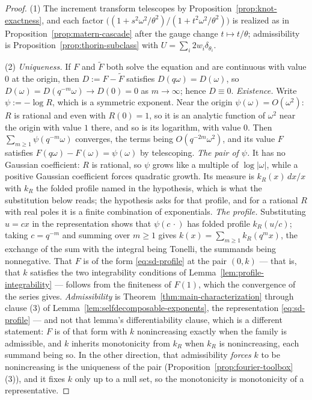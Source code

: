 \begin{proof}
(1) The increment transform telescopes by Proposition~\ref{prop:knot-exactness}, and each
factor $\bigl((1+s^2\omega^2/\theta^2)/(1+t^2\omega^2/\theta^2)\bigr)$ is realized as in
Proposition~\ref{prop:matern-cascade} after the gauge change $t \mapsto t/\theta$;
admissibility is Proposition~\ref{prop:thorin-subclass} with $U = \sum_i 2w_i\delta_{\theta_i}$.

(2) \emph{Uniqueness.} If $F$ and $\tilde F$ both solve the equation and are continuous with
value $0$ at the origin, then $D := F - \tilde F$ satisfies $D(q\omega) = D(\omega)$, so
$D(\omega) = D(q^{-m}\omega) \to D(0) = 0$ as $m \to \infty$; hence $D \equiv 0$.
\emph{Existence.} Write $\psi := -\log R$, which is a symmetric \Levy{} exponent. Near the origin
$\psi(\omega) = O(\omega^2)$: $R$ is rational and even with $R(0) = 1$, so it is an analytic
function of $\omega^2$ near the origin with value $1$ there, and so is its logarithm, with
value $0$. Then
$\sum_{m \ge 1}\psi(q^{-m}\omega)$ converges, the terms being $O(q^{-2m}\omega^2)$, and its
value $F$ satisfies $F(q\omega) - F(\omega) = \psi(\omega)$ by telescoping. \emph{The pair of
$\psi$.} It has no Gaussian coefficient: $R$ is rational, so $\psi$ grows like a multiple of
$\log|\omega|$, while a positive Gaussian coefficient forces quadratic growth. Its \Levy{} measure
is $k_R(x)\,dx/x$ with $k_R$ the folded profile named in the hypothesis, which is what the
substitution below reads; the hypothesis asks for that profile, and for a rational $R$ with real
poles it is a finite combination of exponentials. \emph{The profile.}
Substituting $u = cx$ in the representation shows that $\psi(c\,\cdot)$ has folded profile
$k_R(u/c)$; taking $c = q^{-m}$ and summing over $m \ge 1$ gives
$k(x) = \sum_{m\ge1}k_R(q^mx)$, the exchange of the sum with the integral being Tonelli, the
summands being nonnegative. That $F$ is of the form \ref{eq:sd-profile} at the pair $(0,k)$ ---
that is, that $k$ satisfies the two integrability conditions of
Lemma~\ref{lem:profile-integrability} --- follows from the finiteness of $F(1)$, which the
convergence of the series gives. \emph{Admissibility} is
Theorem~\ref{thm:main-characterization} through clause (3) of
Lemma~\ref{lem:selfdecomposable-exponents}, the representation \ref{eq:sd-profile} --- and not
that lemma's differentiability clause, which is a different statement: $F$ is of that form with $k$ nonincreasing exactly
when the family is admissible, and $k$ inherits monotonicity from $k_R$ when $k_R$ is
nonincreasing, each summand being so. In the other direction, that admissibility \emph{forces}
$k$ to be nonincreasing is the uniqueness of the \Levy{} pair
(Proposition~\ref{prop:fourier-toolbox}(3)), and it fixes $k$ only up to a null set, so the
monotonicity is monotonicity of a representative.
\end{proof}

